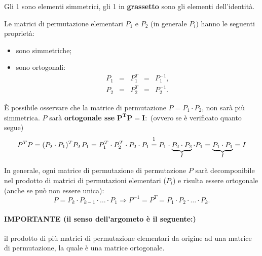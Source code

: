Gli 1  sono elementi simmetrici, gli 1 in \textbf{grassetto} sono gli elementi dell'identità.

Le matrici di permutazione elementari $P_1$ e $P_2$ (in generale $P_i$) hanno le seguenti proprietà:
\begin{itemize}
    \item sono simmetriche;
    \item sono ortogonali:\begin{equation*}
        \begin{matrix}
            P_1 & = & P_1^T & = & P_1^{-1},\\
            P_2 & = & P_2^T & = & P_2^{-1}.
        \end{matrix}
    \end{equation*}
\end{itemize}

È possibile osservare che la matrice di permutazione $P=P_1\cdot P_2$, non sarà più simmetrica. $P$ sarà \textbf{ortogonale sse} $\boldsymbol{P^T P=I}:$ (ovvero se è verificato quanto segue)
\begin{equation*}
    P^TP=(P_2\cdot P_1)^TP_2\, P_1=P_1^T\cdot P_2^T\cdot P_2\cdot P_1\overset{\footnotemark}{=}P_1\cdot \underbrace{P_2\cdot P_2}_{I}\cdot P_1=\underbrace{P_1\cdot P_1}_{I}=I
\end{equation*}

In generale, ogni matrice di permutazione di permutazione $P$ sarà decomponibile nel prodotto di matrici di permutazioni elementari ($P_i$) e risulta essere ortogonale (anche se può non essere unica):
\begin{equation*}
    P=P_k\cdot P_{k-1}\cdot\hdots\cdot P_1\Rightarrow P^{-1}=P^T=P_1\cdot P_2\cdot\hdots\cdot P_k.
\end{equation*}

\paragraph{IMPORTANTE (il senso dell'argometo è il seguente:)}{il prodotto di più matrici di permutazione elementari da origine ad una matrice di permutazione, la quale è una matrice ortogonale.}

